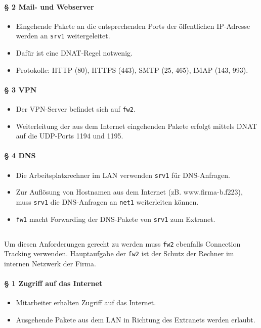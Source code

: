 \paragraph{§ 2 Mail- und Webserver}
\begin{itemize}
\item Eingehende Pakete an die entsprechenden Ports der öffentlichen IP-Adresse werden an {\tt srv1} weitergeleitet.
\item Dafür ist eine DNAT-Regel notwenig.
\item Protokolle: HTTP (80), HTTPS (443), SMTP (25, 465), IMAP (143, 993).
\end{itemize}

\paragraph{§ 3 VPN}
\begin{itemize}
\item Der VPN-Server befindet sich auf {\tt fw2}.
\item Weiterleitung der aus dem Internet eingehenden Pakete erfolgt mittels DNAT auf die UDP-Ports 1194 und 1195.
\end{itemize}

\paragraph{§ 4 DNS}
\begin{itemize}
\item Die Arbeitsplatzrechner im LAN verwenden {\tt srv1} für DNS-Anfragen.
\item Zur Auflösung von Hostnamen aus dem Internet (zB. www.firma-b.f223), muss {\tt srv1} die DNS-Anfragen an {\tt net1} weiterleiten können.
\item {\tt fw1} macht Forwarding der DNS-Pakete von {\tt srv1} zum Extranet.
\end{itemize}

\subsection{\fwb}

Um diesen Anforderungen gerecht zu werden
muss {\tt fw2} ebenfalls Connection Track\-ing verwenden.
Hauptaufgabe der {\tt fw2} ist der Schutz der Rechner im internen Netzwerk
der Firma.

\paragraph{§ 1 Zugriff auf das Internet}
\begin{itemize}
\item Mitarbeiter erhalten Zugriff auf das Internet.
\item Ausgehende Pakete aus dem LAN in Richtung des Extranets werden erlaubt.
\end{itemize}

